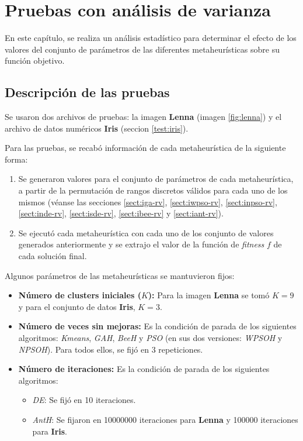 \chapter{Pruebas con análisis de varianza}
\label{apendiceb}


    En este capítulo, se realiza un análisis estadístico para determinar el
efecto de los valores del conjunto de parámetros de las diferentes metaheurísticas
sobre su función objetivo.

\section{Descripción de las pruebas}\label{apendiceb-exp}

    Se usaron dos archivos de pruebas: la imagen \textbf{Lenna} (imagen \ref{fig:lenna})
y el archivo de datos numéricos \textbf{Iris} (seccion \ref{test:iris}).

    Para las pruebas, se recabó información de cada metaheurística de la
siguiente forma:
\begin{enumerate}
    \item Se generaron valores para el conjunto de parámetros de cada
metaheurística, a partir de la permutación de rangos discretos válidos para cada
uno de los mismos (véanse las secciones \ref{sect:iga-rv}, \ref{sect:iwpso-rv},
\ref{sect:inpso-rv}, \ref{sect:inde-rv}, \ref{sect:isde-rv},
\ref{sect:ibee-rv} y \ref{sect:iant-rv}).
    \item Se ejecutó cada metaheurística con cada uno de los conjunto de
valores generados anteriormente y se extrajo el valor de la función de
\emph{fitness} $f$ de cada solución final.
\end{enumerate}

	Algunos parámetros de las metaheurísticas se mantuvieron fijos:
\begin{itemize}
	\item {\bf Número de clusters iniciales ($K$):} Para la imagen {\bf Lenna} se
tomó $K=9$ y para el conjunto de datos {\bf Iris}, $K=3$.

	\item {\bf Número de veces sin mejoras:} Es la condición de parada de los
siguientes algoritmos: \emph{Kmeans}, \emph{GAH}, \emph{BeeH} y \emph{PSO} (en sus
dos versiones: \emph{WPSOH} y \emph{NPSOH}). Para todos ellos, se fijó en 3
repeticiones.

	\item {\bf Número de iteraciones:} Es la condición de parada de los siguientes
algoritmos:
    \begin{itemize}
        \item \emph{DE}: Se fijó en 10 iteraciones.
        \item \emph{AntH}: Se fijaron en 10000000 iteraciones para {\bf Lenna} y
    100000 iteraciones para {\bf Iris}.
    \end{itemize}
\end{itemize}


